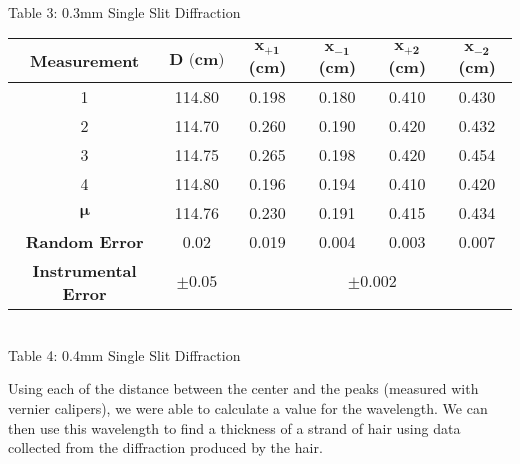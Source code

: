\begin{center}
\begin{tabular}{|c|c|c c c c|}
    \end{tabular}
    \vspace{3mm}
    \\Table 3: 0.3mm Single Slit Diffraction\\
    \vspace{5mm}
    \begin{tabular}{|c|c|c c c c|}
        \hline
        \textbf{Measurement} & $\bm{D\textbf{ (cm)}}$ & $\bm{x_{+1}}$\textbf{(cm)} & $\bm{x_{-1}}$\textbf{(cm)} & $\bm{x_{+2}}$\textbf{(cm)} & $\bm{x_{-2}}$\textbf{(cm)}\\ \hline
        1                     & 114.80& 0.198 & 0.180  & 0.410 & 0.430 \\ 
        2                     & 114.70& 0.260 & 0.190  & 0.420 & 0.432 \\ 
        3                     & 114.75& 0.265 & 0.198  & 0.420 & 0.454 \\ 
        4                     & 114.80& 0.196 & 0.194  & 0.410 & 0.420 \\ \hline \hline
        $\bm{\mu}$            & 114.76& 0.230 & 0.191  & 0.415 & 0.434 \\ 
        \textbf{Random Error} & 0.02  & 0.019 & 0.004  & 0.003 & 0.007 \\ 
        \textbf{Instrumental Error} & $\pm 0.05$ & \multicolumn{4}{c|}{$\pm 0.002$} \\ \hline
    \end{tabular}
    \vspace{3mm}
    \\Table 4: 0.4mm Single Slit Diffraction\\
\end{center}
Using each of the distance between the center and the peaks (measured with vernier calipers), we were able to calculate a value for the wavelength. 
We can then use this wavelength to find a thickness of a strand of hair using data collected from the diffraction produced by the hair.
\newpage
